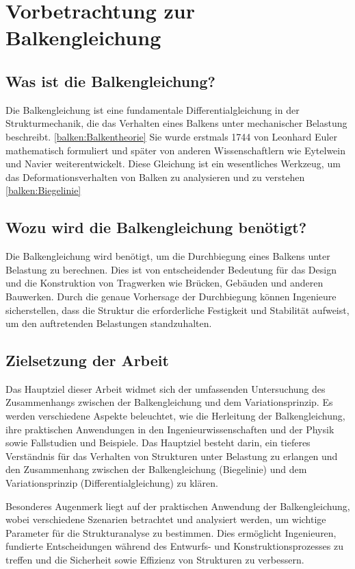 %
%
%
%
\section{Vorbetrachtung zur Balkengleichung\label{balken:section:teil0}}
\subsection{Was ist die Balkengleichung?}
Die Balkengleichung ist eine fundamentale Differentialgleichung in der Strukturmechanik, die das Verhalten eines Balkens unter mechanischer Belastung beschreibt. \ref{balken:Balkentheorie}
Sie wurde erstmals 1744 von Leonhard Euler mathematisch formuliert und später von anderen Wissenschaftlern wie Eytelwein und Navier weiterentwickelt. 
Diese Gleichung ist ein wesentliches Werkzeug, um das Deformationsverhalten von Balken zu analysieren und zu verstehen \ref{balken:Biegelinie}
\subsection{Wozu wird die Balkengleichung benötigt?}
Die Balkengleichung wird benötigt, um die Durchbiegung eines Balkens unter Belastung zu berechnen.
Dies ist von entscheidender Bedeutung für das Design und die Konstruktion von Tragwerken wie Brücken, Gebäuden und anderen Bauwerken. 
Durch die genaue Vorhersage der Durchbiegung können Ingenieure sicherstellen, dass die Struktur die erforderliche Festigkeit und Stabilität aufweist, um den auftretenden Belastungen standzuhalten.
\subsection{Zielsetzung der Arbeit}
Das Hauptziel dieser Arbeit widmet sich der umfassenden Untersuchung des Zusammenhangs zwischen der Balkengleichung und dem Variationsprinzip. 
Es werden verschiedene Aspekte beleuchtet, wie die Herleitung der Balkengleichung, ihre praktischen Anwendungen in den Ingenieurwissenschaften und der Physik sowie Fallstudien und Beispiele. 
Das Hauptziel besteht darin, ein tieferes Verständnis für das Verhalten von Strukturen unter Belastung zu erlangen und den Zusammenhang zwischen der Balkengleichung (Biegelinie) und dem Variationsprinzip (Differentialgleichung) zu klären.

Besonderes Augenmerk liegt auf der praktischen Anwendung der Balkengleichung, wobei verschiedene Szenarien betrachtet und analysiert werden, um wichtige Parameter für die Strukturanalyse zu bestimmen. Dies ermöglicht Ingenieuren, fundierte Entscheidungen während des Entwurfs- und Konstruktionsprozesses zu treffen und die Sicherheit sowie Effizienz von Strukturen zu verbessern.

